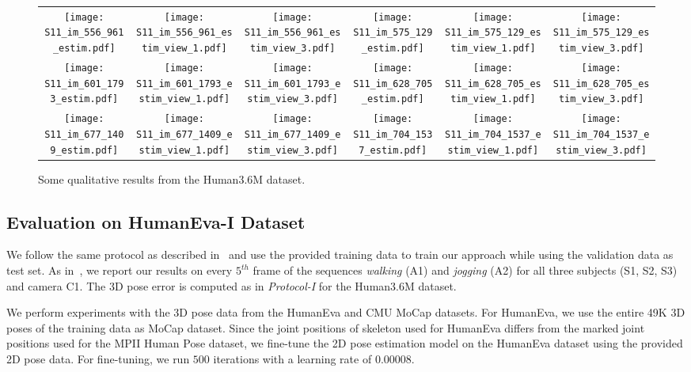 \documentclass[10pt,journal,compsoc]{IEEEtran}
\begin{document}
\begin{figure*}
{\begin{tabular}{c c c | c c c}
\texttt{[image: S11\_im\_556\_961\_estim.pdf]} &
\texttt{[image: S11\_im\_556\_961\_estim\_view\_1.pdf]} &
\texttt{[image: S11\_im\_556\_961\_estim\_view\_3.pdf]} &
\texttt{[image: S11\_im\_575\_129\_estim.pdf]} &
\texttt{[image: S11\_im\_575\_129\_estim\_view\_1.pdf]} &
\texttt{[image: S11\_im\_575\_129\_estim\_view\_3.pdf]} \\
\texttt{[image: S11\_im\_601\_1793\_estim.pdf]} &
\texttt{[image: S11\_im\_601\_1793\_estim\_view\_1.pdf]} &
\texttt{[image: S11\_im\_601\_1793\_estim\_view\_3.pdf]} &
\texttt{[image: S11\_im\_628\_705\_estim.pdf]} &
\texttt{[image: S11\_im\_628\_705\_estim\_view\_1.pdf]} &
\texttt{[image: S11\_im\_628\_705\_estim\_view\_3.pdf]} \\
\texttt{[image: S11\_im\_677\_1409\_estim.pdf]} &
\texttt{[image: S11\_im\_677\_1409\_estim\_view\_1.pdf]} &
\texttt{[image: S11\_im\_677\_1409\_estim\_view\_3.pdf]} &
\texttt{[image: S11\_im\_704\_1537\_estim.pdf]} &
\texttt{[image: S11\_im\_704\_1537\_estim\_view\_1.pdf]} &
\texttt{[image: S11\_im\_704\_1537\_estim\_view\_3.pdf]} \\
\end{tabular}
}
\vspace{1em}
\caption{Some qualitative results from the Human3.6M \cite{h36m_pami} dataset.}
\label{fig:qualitative_h36m}
\end{figure*}


\subsection{Evaluation on HumanEva-I Dataset}\label{sec:EvaI}
We follow the same protocol as described in~\cite{SimoSerraCVPR2013,Ilya_2014} and use the provided training data to train our approach while 
using the validation data as test set. As in~\cite{SimoSerraCVPR2013,Ilya_2014}, we report our results on every $5^{th}$ frame of the 
sequences \textit{walking} (A1) and \textit{jogging} (A2) for all three subjects (S1, S2, S3) and camera C1. The 3D pose error is computed as in \emph{Protocol-I} for the Human3.6M dataset. 

We perform experiments with the 3D pose data from the HumanEva and CMU MoCap datasets. For HumanEva, we use the entire 49K 3D poses of the training data as MoCap dataset. Since the joint positions of skeleton used for HumanEva differs from the marked joint positions used for the MPII Human Pose dataset, we fine-tune the 2D pose estimation model on the HumanEva dataset using the provided 2D pose data.  
For fine-tuning, we run $500$ iterations with a learning rate of $0.00008$. 
\end{document}
